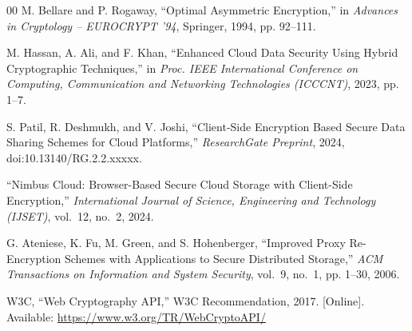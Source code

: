 \documentclass[conference]{IEEEtran}
\begin{document}
\begin{thebibliography}{00}
M. Bellare and P. Rogaway, ``Optimal Asymmetric Encryption,'' in \textit{Advances in Cryptology -- EUROCRYPT '94}, Springer, 1994, pp. 92--111.

M. Hassan, A. Ali, and F. Khan, ``Enhanced Cloud Data Security Using Hybrid Cryptographic Techniques,'' in \textit{Proc. IEEE International Conference on Computing, Communication and Networking Technologies (ICCCNT)}, 2023, pp. 1--7.

S. Patil, R. Deshmukh, and V. Joshi, ``Client-Side Encryption Based Secure Data Sharing Schemes for Cloud Platforms,'' \textit{ResearchGate Preprint}, 2024, doi:10.13140/RG.2.2.xxxxx.

``Nimbus Cloud: Browser-Based Secure Cloud Storage with Client-Side Encryption,'' \textit{International Journal of Science, Engineering and Technology (IJSET)}, vol.~12, no.~2, 2024.

G. Ateniese, K. Fu, M. Green, and S. Hohenberger, ``Improved Proxy Re-Encryption Schemes with Applications to Secure Distributed Storage,'' \textit{ACM Transactions on Information and System Security}, vol.~9, no.~1, pp. 1--30, 2006.

W3C, ``Web Cryptography API,'' W3C Recommendation, 2017. [Online]. Available: \url{https://www.w3.org/TR/WebCryptoAPI/}

\end{thebibliography}
\end{document}
